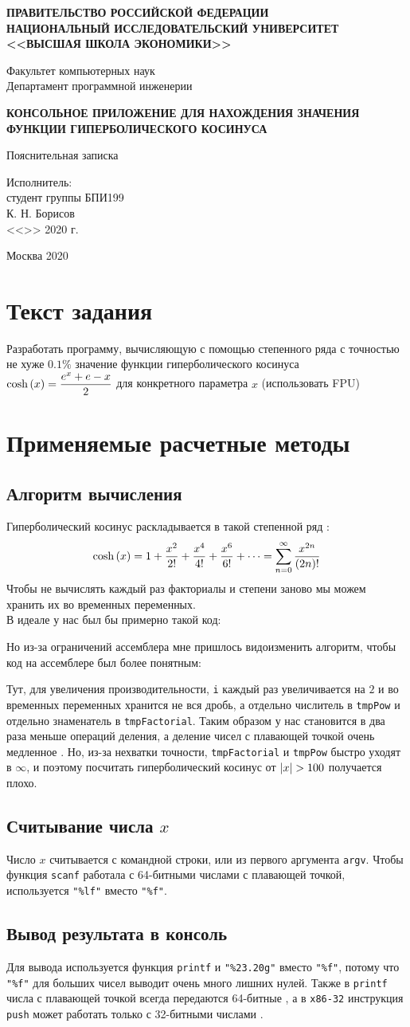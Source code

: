 \documentclass[a4paper]{article}
\newcommand{\titlePage}{
  \begin{center}
    \Large
    \textbf{
      ПРАВИТЕЛЬСТВО РОССИЙСКОЙ ФЕДЕРАЦИИ \\
      НАЦИОНАЛЬНЫЙ ИССЛЕДОВАТЕЛЬСКИЙ УНИВЕРСИТЕТ \\
      <<ВЫСШАЯ ШКОЛА ЭКОНОМИКИ>> \\
    }
    \par\vspace{5mm}
    Факультет компьютерных наук \\
    Департамент программной инженерии \\
  \end{center}
  \vspace*{\fill}
  \begin{center}
    \Large\bf
    КОНСОЛЬНОЕ ПРИЛОЖЕНИЕ ДЛЯ НАХОЖДЕНИЯ ЗНАЧЕНИЯ ФУНКЦИИ ГИПЕРБОЛИЧЕСКОГО КОСИНУСА
    \par
    Пояснительная записка
  \end{center}
  \vspace*{\fill}
  \begin{flushright}
		Исполнитель: \\ студент группы БПИ199 \\
		\underline{\hspace{4cm}} К. Н. Борисов \\
		<<\underline{\hspace{1cm}}>> \underline{\hspace{4cm}} 2020 г. \\
  \end{flushright}
  \vspace*{\fill}
  \begin{center}Москва 2020\end{center}
}
\newcommand{\frameCode}[1]{
  \begin{center}
    \begin{minipage}{0.5\textwidth}
      \VerbatimInput[frame=single]{#1}
    \end{minipage}
  \end{center}
}
\begin{document}
  \titlePage
  \newpage
  \tableofcontents
  \newpage

  \section{Текст задания}
  Разработать программу, вычисляющую с помощью степенного ряда с точностью не хуже $0.1\%$ значение функции
  гиперболического косинуса $\displaystyle\cosh\left(x\right) = \frac{e^x+e-x}{2}$ для конкретного параметра $x$ (использовать FPU) \cite{task}

  \newpage
  \section{Применяемые расчетные методы}
  \subsection{Алгоритм вычисления}
  Гиперболический косинус раскладывается в такой степенной ряд \cite{cosh}:
  $$ \cosh\left(x\right) = 1 + \frac{x^2}{2!} + \frac{x^4}{4!} + \frac{x^6}{6!} + \cdots = \sum_{n=0}^\infty \frac{x^{2n}}{(2n)!} $$
  Чтобы не вычислять каждый раз факториалы и степени заново мы можем хранить их во временных переменных. \\
  В идеале у нас был бы примерно такой код:
  \frameCode{../asm/mp01/algo.c}
  Но из-за ограничений ассемблера мне пришлось видоизменить алгоритм, чтобы код на ассемблере был более понятным:
  \frameCode{../asm/mp01/impl.c}
  Тут, для увеличения производительности, \texttt{i} каждый раз увеличивается на $2$ и во временных переменных хранится не вся дробь,
  а отдельно числитель в \texttt{tmpPow} и отдельно знаменатель в \texttt{tmpFactorial}.
  Таким образом у нас становится в два раза меньше операций деления, а деление чисел с плавающей точкой очень медленное \cite{fdiv}.
  Но, из-за нехватки точности, \texttt{tmpFactorial} и \texttt{tmpPow} быстро уходят в $\infty$,
  и поэтому посчитать гиперболический косинус от $\left|x\right| > 100$ получается плохо.

  \subsection{Считывание числа $x$}
  Число $x$ считывается с командной строки, или из первого аргумента \texttt{argv}.
  Чтобы функция \texttt{scanf} работала с 64-битными числами с плавающей точкой,
  используется \texttt{"\%lf"} вместо \texttt{"\%f"}.

  \subsection{Вывод результата в консоль}
  Для вывода используется функция \texttt{printf} и \texttt{"\%23.20g"} вместо \texttt{"\%f"},
  потому что \texttt{"\%f"} для больших чисел выводит очень много лишних нулей.
  Также в \texttt{printf} числа с плавающей точкой всегда передаются 64-битные \cite{promo},
  а в \texttt{x86-32} инструкция \texttt{push} может работать только с 32-битными числами \cite{x86}.
\end{document}
